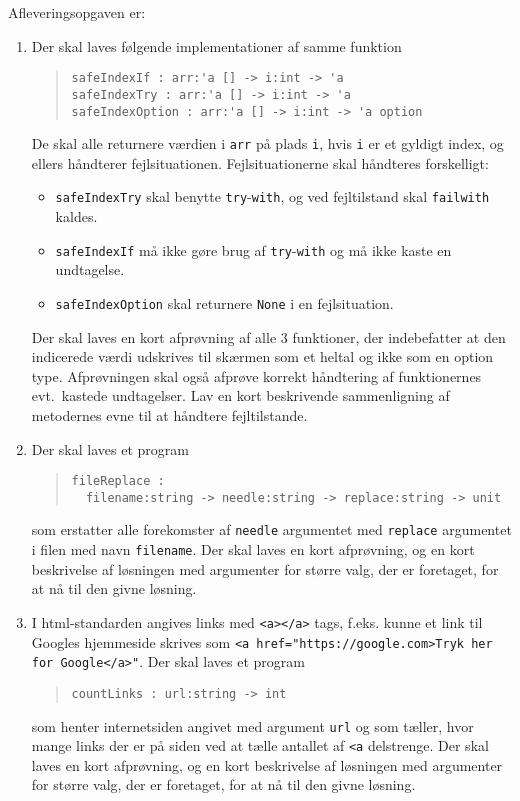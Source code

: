 \documentclass[a4paper,12pt]{article}
\begin{document}
Afleveringsopgaven er:
\begin{enumerate}[label=7i.\arabic*,start=0]
\item Der skal laves følgende implementationer af samme funktion
  \begin{quote}
    \mbox{\lstinline!safeIndexIf : arr:'a [] -> i:int -> 'a!}
    \\\mbox{\lstinline!safeIndexTry : arr:'a [] -> i:int -> 'a!}
    \\\mbox{\lstinline!safeIndexOption : arr:'a [] -> i:int -> 'a option!}
  \end{quote}
  De skal alle returnere værdien i \lstinline!arr! på plads \lstinline!i!, hvis \lstinline!i! er et gyldigt index, og ellers håndterer fejlsituationen.  Fejlsituationerne skal håndteres forskelligt:
  \begin{itemize}
  \item \lstinline!safeIndexTry! skal benytte \lstinline!try!-\lstinline!with!, og ved fejltilstand skal \lstinline!failwith! kaldes. 
  \item \lstinline!safeIndexIf! må ikke gøre brug af \lstinline!try!-\lstinline!with! og må ikke kaste en undtagelse. 
  \item \lstinline!safeIndexOption! skal returnere \lstinline!None! i en fejlsituation. 
  \end{itemize}
   Der skal laves en kort afprøvning af alle 3 funktioner, der indebefatter at den indicerede værdi udskrives til skærmen som et heltal og ikke som en option type. Afprøvningen skal også afprøve korrekt håndtering af funktionernes evt.\ kastede undtagelser.  Lav en kort beskrivende sammenligning af metodernes evne til at håndtere fejltilstande.
 \item Der skal laves et program
  \begin{quote}
    \lstinline!fileReplace :!
    \\\noindent\lstinline!  filename:string -> needle:string -> replace:string -> unit!
  \end{quote}
  som erstatter alle forekomster af \lstinline!needle! argumentet med \lstinline!replace! argumentet i filen med navn \lstinline!filename!. Der skal laves en kort afprøvning, og en kort beskrivelse af løsningen med argumenter for større valg, der er foretaget, for at nå til den givne løsning.
\item I html-standarden angives links med \lstinline!<a></a>! tags, f.eks. kunne et link til Googles hjemmeside skrives som \lstinline!<a href="https://google.com>Tryk her for Google</a>"!. Der skal laves et program
  \begin{quote}
    \mbox{\lstinline!countLinks : url:string -> int!}
  \end{quote}
  som henter internetsiden angivet med argument \lstinline!url! og som tæller, hvor mange links der er på siden ved at tælle antallet af \lstinline!<a! delstrenge. Der skal laves en kort afprøvning, og en kort beskrivelse af løsningen med argumenter for større valg, der er foretaget, for at nå til den givne løsning.
\end{enumerate}
\end{document}
